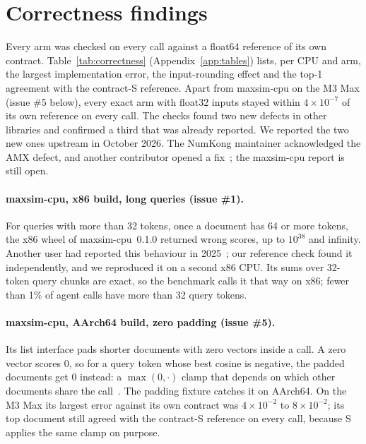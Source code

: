 \section{Correctness findings}
\label{sec:correctness}

Every arm was checked on every call against a float64 reference of its own contract.
Table~\ref{tab:correctness} (Appendix~\ref{app:tables}) lists, per CPU and arm, the largest implementation error, the input-rounding effect and the top-1 agreement with the contract-S reference.
Apart from maxsim-cpu on the M3 Max (issue \#5 below), every exact arm with float32 inputs stayed within $4\times10^{-7}$ of its own reference on every call.
The checks found two new defects in other libraries and confirmed a third that was already reported. We reported the two new ones upstream in October 2026. The NumKong maintainer acknowledged the AMX defect, and another contributor opened a fix~\cite{numkong_pr409}; the maxsim-cpu report is still open.

\paragraph{maxsim-cpu, x86 build, long queries (issue \#1).}
For queries with more than 32 tokens, once a document has 64 or more tokens, the x86 wheel of maxsim-cpu~0.1.0 returned wrong scores, up to $10^{38}$ and infinity.
Another user had reported this behaviour in 2025~\cite{maxsimcpu_issue1}; our reference check found it independently, and we reproduced it on a second x86 CPU.
Its sums over 32-token query chunks are exact, so the benchmark calls it that way on x86; fewer than 1\% of agent calls have more than 32 query tokens.

\paragraph{maxsim-cpu, AArch64 build, zero padding (issue \#5).}
Its list interface pads shorter documents with zero vectors inside a call.
A zero vector scores 0, so for a query token whose best cosine is negative, the padded documents get 0 instead: a $\max(0,\cdot)$ clamp that depends on which other documents share the call~\cite{maxsimcpu_issue5}.
The padding fixture catches it on AArch64.
On the M3 Max its largest error against its own contract was $4\times10^{-2}$ to $8\times10^{-2}$; its top document still agreed with the contract-S reference on every call, because S applies the same clamp on purpose.

